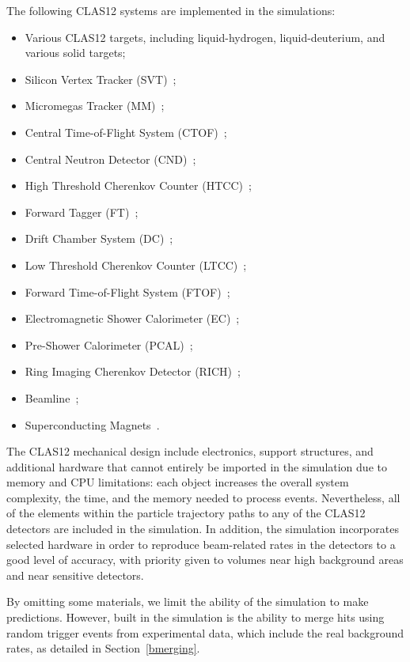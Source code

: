 The following CLAS12 systems are implemented in the simulations:

\begin{itemize}
\item Various CLAS12 targets, including liquid-hydrogen, liquid-deuterium, and various solid targets;
\item Silicon Vertex Tracker (SVT)~\cite{svt-nim};
\item Micromegas Tracker (MM)~\cite{mm-nim};
\item Central Time-of-Flight System (CTOF)~\cite{ctof-nim};
\item Central Neutron Detector (CND)~\cite{cnd-nim};
\item High Threshold Cherenkov Counter (HTCC)~\cite{htcc-nim};
\item Forward Tagger (FT)~\cite{ft-nim};
\item Drift Chamber System (DC)~\cite{dc-nim};
\item Low Threshold Cherenkov Counter (LTCC)~\cite{ltcc-nim};
\item Forward Time-of-Flight System (FTOF)~\cite{ftof-nim};
\item Electromagnetic Shower Calorimeter (EC)~\cite{Amarian:2001zs};
\item Pre-Shower Calorimeter (PCAL)~\cite{ec-nim};
\item Ring Imaging Cherenkov Detector (RICH)~\cite{rich-nim};
\item Beamline~\cite{beamline-nim};
\item Superconducting Magnets~\cite{magnets-nim}.
\end{itemize}

The CLAS12 mechanical design include electronics, support structures, and additional hardware that cannot
entirely be imported in the simulation due to memory and CPU limitations: each object increases the overall
system complexity, the time, and the memory needed to process events. Nevertheless, all of the elements
within the particle trajectory paths to any of the CLAS12 detectors are included in the simulation.
In addition, the simulation incorporates selected hardware in order to reproduce beam-related
rates in the detectors to a good level of accuracy, with priority given to volumes near high background
areas and near sensitive detectors.

By omitting some materials, we limit the ability of the simulation to make predictions. However, built in the
simulation is the ability to merge hits using random trigger events from experimental data, which include the
real background rates, as detailed in Section~\ref{bmerging}.

